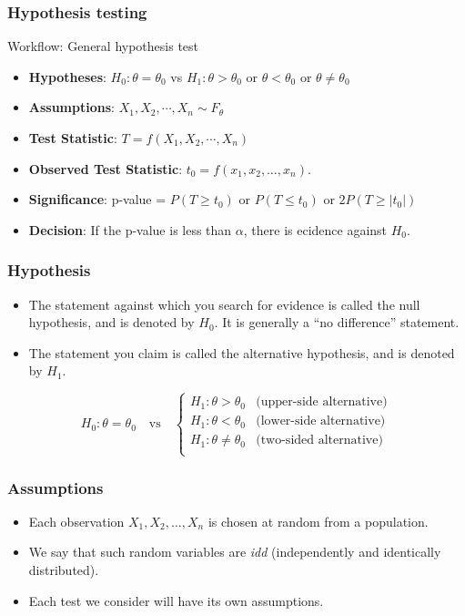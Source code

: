 \documentclass[a4paper]{article}
\begin{document}
\subsubsection{Hypothesis testing}
\begin{redbox}{Workflow: General hypothesis test}
	\begin{itemize}
		\item \textbf{Hypotheses}: \( H_0: \theta = \theta_0 \) vs \( H_1: \theta > \theta_0 \) or \( \theta < \theta_0 \) or \( \theta \neq \theta_0 \)
		\item \textbf{Assumptions}: \( X_1,X_2,\dotsb,X_n \sim F_\theta \)
		\item \textbf{Test Statistic}: \( T = f(X_1,X_2,\dotsb,X_n) \)  
		\item \textbf{Observed Test Statistic}: \( t_0 = f(x_1,x_2,\dotsc,x_n) \).
		\item \textbf{Significance}: p-value = \( P(T \geq t_0) \) or \( P(T \leq t_0) \) or \( 2P(T \geq \lvert t_0 \rvert) \)
		\item \textbf{Decision}:  If the p-value is less than \( \alpha \), there is ecidence against \( H_0 \).
	\end{itemize}
\end{redbox}
\subsubsection{Hypothesis}
\begin{itemize}
	\item The statement against which you search for evidence is called the null hypothesis, and is denoted by \( H_0 \). It is generally a ``no difference'' statement.
	\item The statement you claim is called the alternative hypothesis, and is denoted by \( H_1 \).
\end{itemize}
\[
	H_0: \theta = \theta_0 \quad\text{vs}\quad
	\begin{cases}
		H_1: \theta > \theta_0 &\text{(upper-side alternative)} \\
		H_1: \theta < \theta_0 &\text{(lower-side alternative)} \\
		H_1: \theta \neq \theta_0 &\text{(two-sided alternative)} \\
	\end{cases}
\]
\subsubsection{Assumptions}
\begin{itemize}
	\item Each observation \( X_1,X_2,\dotsc,X_n \) is chosen at random from a population.
	\item We say that such random variables are \textit{idd} (independently and identically distributed).
	\item Each test we consider will have its own assumptions.
\end{itemize}
\end{document}
